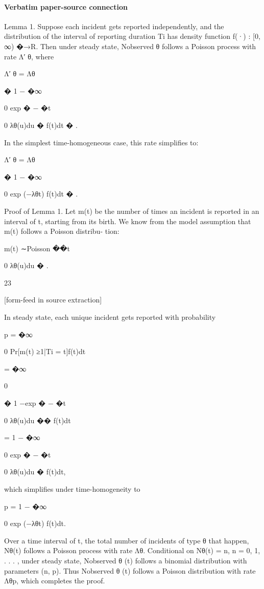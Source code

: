 \documentclass[10pt]{article}
\begin{document}
\paragraph{Verbatim paper-source connection}
\begin{ReviewVerbatim}
Lemma 1. Suppose each incident gets reported independently, and the distribution of the interval
of reporting duration Ti has density function f(·) : [0, ∞) �→R. Then under steady state, Nobserved
θ
follows a Poisson process with rate Λ′
θ, where

Λ′
θ = Λθ

�
1 −
�∞

0
exp
�
−
�t

0
λθ(u)du
�
f(t)dt
�
.

In the simplest time-homogeneous case, this rate simplifies to:

Λ′
θ = Λθ

�
1 −
�∞

0
exp (−λθt) f(t)dt
�
.

Proof of Lemma 1. Let m(t) be the number of times an incident is reported in an interval of t,
starting from its birth. We know from the model assumption that m(t) follows a Poisson distribu-
tion:

m(t) ∼Poisson
��t

0
λθ(u)du
�
.

23


[form-feed in source extraction]

In steady state, each unique incident gets reported with probability

p =
�∞

0
Pr[m(t) ≥1|Ti = t]f(t)dt

=
�∞

0

�
1 −exp
�
−
�t

0
λθ(u)du
��
f(t)dt

= 1 −
�∞

0
exp
�
−
�t

0
λθ(u)du
�
f(t)dt,

which simplifies under time-homogeneity to

p = 1 −
�∞

0
exp (−λθt) f(t)dt.

Over a time interval of t, the total number of incidents of type θ that happen, Nθ(t) follows
a Poisson process with rate Λθ.
Conditional on Nθ(t) = n, n = 0, 1, . . . , under steady state,
Nobserved
θ
(t) follows a binomial distribution with parameters (n, p).
Thus Nobserved
θ
(t) follows a
Poisson distribution with rate Λθp, which completes the proof.
\end{ReviewVerbatim}
\end{document}

